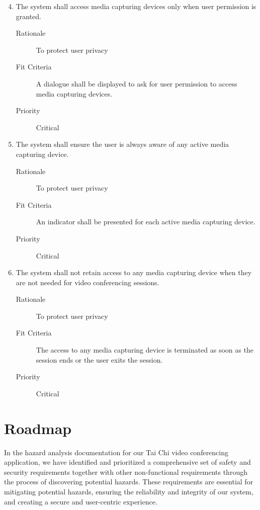 \documentclass{article}
\begin{document}
\begin{enumerate}[label=\textbf{SR\arabic*}]
  \setcounter{enumi}{3}
\item The system shall access media capturing devices only when user permission is
  granted. \label{SR4}
	\begin{description}
  \item[Rationale] To protect user privacy
	\item[Fit Criteria] A dialogue shall be displayed to ask for user permission to
    access media capturing devices.
	\item[Priority] Critical
  \end{description}
\item The system shall ensure the user is always aware of any active
  media capturing device. \label{SR5}
	\begin{description}
  \item[Rationale] To protect user privacy
	\item[Fit Criteria] An indicator shall be presented for each active media
    capturing device.
	\item[Priority] Critical
  \end{description}
\item The system shall not retain access to any media capturing device when they
  are not needed for video conferencing sessions. \label{SR6}
	\begin{description}
  \item[Rationale] To protect user privacy
	\item[Fit Criteria] The access to any media capturing device is terminated as
    soon as the session ends or the user exits the session.
	\item[Priority] Critical
  \end{description}
\end{enumerate}

\section{Roadmap}

In the hazard analysis documentation for our Tai Chi video conferencing
application, we have identified and prioritized a comprehensive set of safety
and security requirements together with other non-functional requirements
through the process of discovering potential hazards. These requirements are
essential for mitigating potential hazards, ensuring the reliability and
integrity of our system, and creating a secure and user-centric experience.
\end{document}
